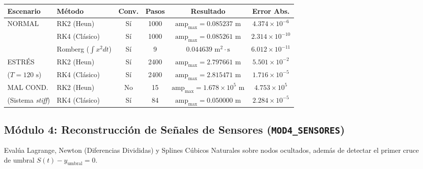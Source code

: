 \documentclass[11pt,a4paper]{article}
\begin{document}
\begin{table}[h!]
\centering
\small
\begin{tabular}{llcccc}
\toprule
\textbf{Escenario} & \textbf{Método} & \textbf{Conv.} & \textbf{Pasos} & \textbf{Resultado} & \textbf{Error Abs.} \\
\midrule
NORMAL & RK2 (Heun) & Sí & 1000 & $\text{amp}_{\max}=0.085237\text{ m}$ & $4.374\times 10^{-6}$ \\
 & RK4 (Clásico) & Sí & 1000 & $\text{amp}_{\max}=0.085261\text{ m}$ & $2.314\times 10^{-10}$ \\
 & Romberg ($\int x^2 dt$) & Sí & 9 & $0.044639\text{ m}^2\cdot\text{s}$ & $6.012\times 10^{-11}$ \\
\midrule
ESTRÉS & RK2 (Heun) & Sí & 2400 & $\text{amp}_{\max}=2.797661\text{ m}$ & $5.501\times 10^{-2}$ \\
($T=120\text{ s}$) & RK4 (Clásico) & Sí & 2400 & $\text{amp}_{\max}=2.815471\text{ m}$ & $1.716\times 10^{-5}$ \\
\midrule
MAL COND. & RK2 (Heun) & No & 15 & $\text{amp}_{\max}=1.678\times 10^{5}\text{ m}$ & $4.753\times 10^{5}$ \\
(Sistema \textit{stiff}) & RK4 (Clásico) & Sí & 84 & $\text{amp}_{\max}=0.050000\text{ m}$ & $2.284\times 10^{-5}$ \\
\bottomrule
\end{tabular}
\end{table}

\subsection{Módulo 4: Reconstrucción de Señales de Sensores (\texttt{MOD4\_SENSORES})}
Evalúa Lagrange, Newton (Diferencias Divididas) y Splines Cúbicos Naturales sobre nodos ocultados, además de detectar el primer cruce de umbral $S(t)-y_{\text{umbral}}=0$.
\end{document}
